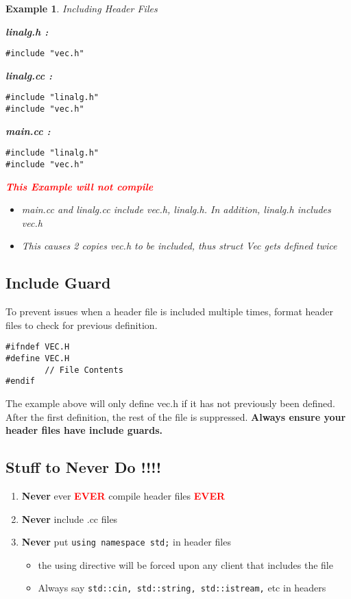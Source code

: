 \documentclass{article}
\newtheorem{ex}[theorem]{Example}
\begin{document}
\newpage

\begin{ex} Including Header Files

\textbf{linalg.h :}
\begin{lstlisting}
#include "vec.h"
\end{lstlisting}

\textbf{linalg.cc :}
\begin{lstlisting}
#include "linalg.h"
#include "vec.h"
\end{lstlisting}

\textbf{main.cc :}
\begin{lstlisting}
#include "linalg.h"
#include "vec.h"
\end{lstlisting}

\textbf{\textcolor{red}{This Example will not compile}}
\begin{itemize}
\item main.cc and linalg.cc include vec.h, linalg.h. In addition, linalg.h includes vec.h 
\item This causes 2 copies vec.h to be included, thus struct Vec gets defined twice 
\end{itemize}
\end{ex}

\subsection{Include Guard}
To prevent issues when a header file is included multiple times, format header files to check for previous definition.
\begin{lstlisting}
#ifndef VEC.H
#define VEC.H
		// File Contents
#endif 
\end{lstlisting}

The example above will only define vec.h if it has not previously been defined. After the first definition, the rest of the file is suppressed. 
\textbf{Always ensure your header files have include guards.}

\subsection{Stuff to Never Do !!!!}
\begin{enumerate}
\item \textbf{Never} ever \textbf{\textcolor{red}{EVER}} compile header files \textbf{\textcolor{red}{EVER}}
\item \textbf{Never} include .cc files 
\item \textbf{Never} put \verb|using namespace std;|  in header files 
\begin{itemize}
\item the using directive will be forced upon any client that includes the file
\item Always say \verb|std::cin, std::string, std::istream,| etc in headers
\end{itemize}

\end{enumerate}
\end{document}
